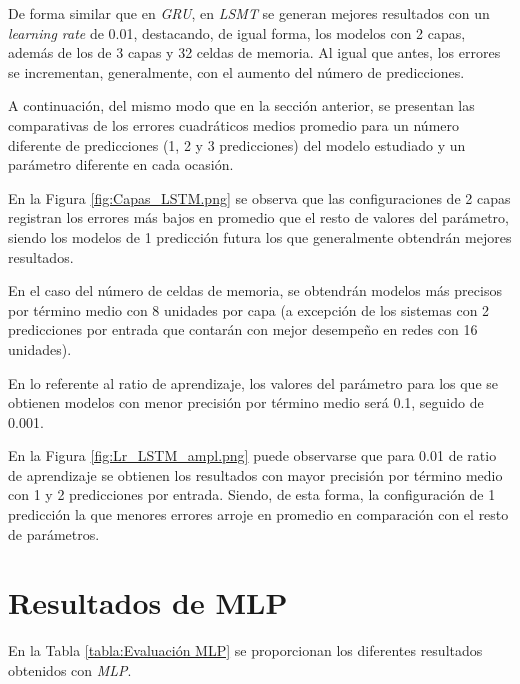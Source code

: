 De forma similar que en \textit{GRU}, en \textit{LSMT} se generan mejores resultados con un 
\textit{learning rate} de 0.01, destacando, de igual forma, los modelos con 2 capas, además
de los de 3 capas y 32 celdas de memoria.
Al igual que antes, los errores se incrementan, generalmente, con el aumento del número de predicciones.

A continuación, del mismo modo que en la sección anterior, se presentan las comparativas de los errores 
cuadráticos medios promedio para un número diferente de predicciones (1, 2 y 3 predicciones) del modelo estudiado y un parámetro diferente en cada ocasión.

En la Figura \ref{fig:Capas_LSTM.png} se observa que las configuraciones de 2 capas registran los 
errores más bajos en promedio que el resto de valores del parámetro, siendo los modelos de 1 predicción
futura los que generalmente obtendrán mejores resultados.

En el caso del número de celdas de memoria, se obtendrán modelos más precisos por término medio con 8 
unidades por capa (a excepción de los sistemas con 2 predicciones por entrada que contarán con mejor 
desempeño en redes con 16 unidades). 

En lo referente al ratio de aprendizaje, los valores del parámetro para los que se obtienen modelos
con menor precisión por término medio será 0.1, seguido de 0.001.

En la Figura \ref{fig:Lr_LSTM_ampl.png} puede observarse que para 0.01 de ratio de aprendizaje se obtienen
los resultados con mayor precisión por término medio con 1 y 2 predicciones por entrada. Siendo, de esta forma,
la configuración de 1 predicción la que menores errores arroje en promedio en comparación con el resto
de parámetros.

\newpage

\section{Resultados de MLP}
En la Tabla \ref{tabla:Evaluación MLP} se proporcionan los diferentes resultados obtenidos con \textit{MLP}.

